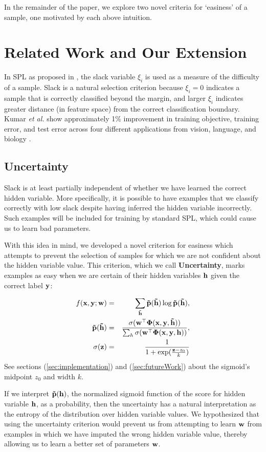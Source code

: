 \documentclass{article}
\newcommand{\mysection}[1]{\vspace{-4mm}\section{#1}\vspace{-4mm}}
\begin{document}
In the remainder of the paper, we explore two novel criteria for `easiness' of a sample, one motivated by each above intuition.

\mysection{Related Work and Our Extension}
\label{sec:related}
In SPL as proposed in \cite{SPL}, the slack variable $\xi_i$ is used as a measure of the difficulty of a sample.  Slack is a natural selection criterion because $\xi_i=0$ indicates a sample that is correctly classified beyond the margin, and larger $\xi_i$ indicates greater distance (in feature space) from the correct classification boundary. Kumar \textit{et al.} show approximately 1\% improvement in training objective, training error, and test error across four different applications from vision, language, and biology \cite{SPL}.

\subsection{Uncertainty}

Slack is at least partially independent of whether we have learned the correct hidden variable. More specifically, it is possible to have examples that we classify correctly with low slack despite having inferred the hidden variable incorrectly. Such examples will be included for training by standard SPL, which could cause us to learn bad parameters. 

With this idea in mind, we developed a novel criterion for easiness which attempts to prevent the selection of samples for which we are not confident about the hidden variable value. This criterion, which we call \textbf{Uncertainty}, marks examples as easy when we are certain of their hidden variables $\bf h$ given the correct label $\bf y$: 

\begin{eqnarray}
f(\bf x, \bf y; \bf w) &=& \sum_{\bf\tilde{h}} \bf\tilde p({\tilde h}) \log\bf\tilde p(\bf{\tilde h}),  \\
\bf{\tilde{p}(\tilde h)} &=&\frac{\sigma(\bf{w}^\top\Phi(\bf x,y, \tilde h))}{\sum_{h}\sigma(\bf w^\top\Phi(\bf x,\bf y,\bf h))}, \nonumber \\
\sigma(\bf z) &=& \frac{1}{1+\exp(\frac{{\bf z} - z_0}{k})} \nonumber
\label{eq:uncertainty}
\end{eqnarray}
See sections (\ref{sec:implementation}) and (\ref{sec:futureWork}) about the sigmoid's midpoint $z_0$ and width $k$.

If we interpret $\bf\tilde p(\bf h)$, the normalized sigmoid function of the score for hidden variable $\bf h$, as a probability, then the uncertainty has a natural interpretation as the entropy of the distribution over hidden variable values. We hypothesized that using the uncertainty criterion would prevent us from attempting to learn $\bf w$ from examples in which we have imputed the wrong hidden variable value, thereby allowing us to learn a better set of parameters $\bf w$. 
\end{document}
